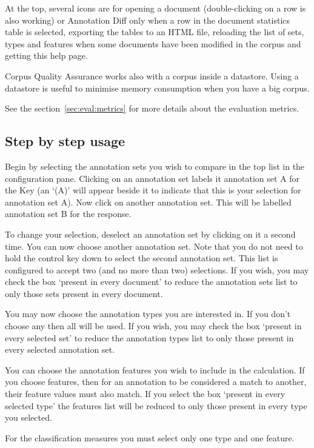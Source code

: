 At the top, several icons are for opening a document (double-clicking on a
row is also working) or Annotation Diff only when a row in the document
statistics table is selected, exporting the tables to an HTML file,
reloading the list of sets, types and features when some documents have been
modified in the corpus and getting this help page.

Corpus Quality Assurance works also with a corpus inside a datastore. Using a
datastore is useful to minimise memory consumption when you have a big
corpus.

See the section~\ref{sec:eval:metrics} for more details about the evaluation
metrics.

\subsection{Step by step usage}

Begin by selecting the annotation sets you wish to compare in the top list
in the configuration pane. Clicking on an annotation set labels it
annotation set A for the Key (an `(A)' will appear beside it to indicate
that this is your selection for annotation set A). Now click on another
annotation set. This will be labelled annotation set B for the response.

To change your selection, deselect an annotation set by
clicking on it a second time. You can now choose another annotation set. Note
that you do not need to hold the control key down to select the second
annotation set. This list is configured to accept two (and no more than two)
selections. If you wish, you may check the box `present in every document' to
reduce the annotation sets list to only those sets present in every document.

You may now choose the annotation types you are interested in. If you don't
choose any then all will be used. If you wish, you may check the box
`present in every selected set' to reduce the annotation types list to only
those present in every selected annotation set.

You can choose the annotation features you wish to include in the
calculation. If you choose features, then for an annotation to be considered
a match to another, their feature values must also match. If you select the
box `present in every selected type' the features list will be reduced to
only those present in every type you selected.

For the classification measures you must select only one type and one feature.

